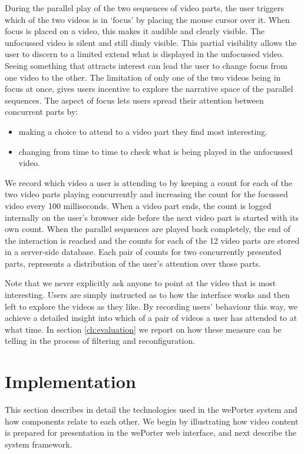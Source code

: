 During the parallel play of the two sequences of video parts, the user triggers which of the two videos is in `focus' by placing the mouse cursor over it. When focus is placed on a video, this makes it audible and clearly visible. The unfocussed video is silent and still dimly visible. This partial visibility allows the user to discern to a limited extend what is displayed in the unfocussed video. Seeing something that attracts interest can lead the user to change focus from one video to the other. The limitation of only one of the two videos being in focus at once, gives users incentive to explore the narrative space of the parallel sequences. The aspect of focus lets users spread their attention between concurrent parts by:
\begin{itemize}
  \item making a choice to attend to a video part they find most interesting.
  \item changing from time to time to check what is being played in the unfocussed video.
\end{itemize}

We record which video a user is attending to by keeping a count for each of the two video parts playing concurrently and increasing the count for the focussed video every 100 milliseconds. When a video part ends, the count is logged internally on the user's browser side before the next video part is started with its own count. When the parallel sequences are played back completely, the end of the interaction is reached and the counts for each of the 12 video parts are stored in a server-side database. Each pair of counts for two concurrently presented parts, represents a distribution of the user's attention over those parts.

Note that we never explicitly ask anyone to point at the video that is most interesting. Users are simply instructed as to how the interface works and then left to explore the videos as they like. By recording users' behaviour this way, we achieve a detailed insight into which of a pair of videos a user has attended to at what time. In section \ref{ch:evaluation} we report on how these measure can be telling in the process of filtering and reconfiguration. 

\section{Implementation}
\label{sec:weporter_implementation}

This section describes in detail the technologies used in the wePorter system and how components relate to each other. We begin by illustrating how video content is prepared for presentation in the wePorter web interface, and next describe the system framework. 

